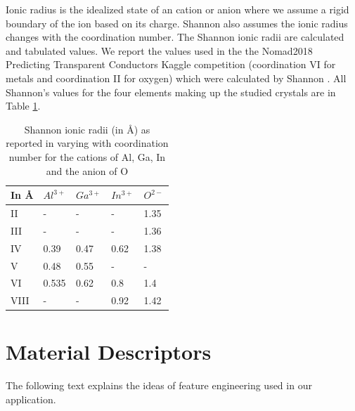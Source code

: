 \documentclass[11pt,oneside,czech,american]{book} %
\theoremstyle{plain}
\theoremstyle{definition}
\begin{document}
Ionic radius is the idealized state of an cation or anion where we assume a rigid boundary of the ion based on its charge. Shannon also assumes the ionic radius changes with the coordination number. The Shannon ionic radii are calculated and tabulated values. We report the values used in the the Nomad2018 Predicting Transparent Conductors Kaggle competition (coordination VI for metals and coordination II for oxygen) which were calculated by Shannon \parencite{shannon76}.  All Shannon's values for the four elements making up the studied crystals are in Table \ref{shannon_radii}.

\begin{table}[H]
	\centering
	\begin{tabular}{lllll} 
		\hline
		In \AA & $Al^{3+}$    & $Ga^{3+}$    & $In^{3+}$    & $O^{2-}$    \\ 
		\hline
		II     & - & - & - & 1.35  \\
		
		III     & - & - & - & 1.36  \\ 
		
		IV     & 0.39 & 0.47 & 0.62 & 1.38  \\ 
		
		V   & 0.48 & 0.55 & - & -  \\ 
		
		VI   & 0.535 & 0.62 & 0.8 & 1.4  \\ 
		
		VIII   & - & - & 0.92 & 1.42  \\
		\hline
	\end{tabular}
	
	\caption{Shannon ionic radii (in \AA) as reported in \parencite{shannon76} varying with coordination number for the cations of Al, Ga, In and the anion of O}
	\label{shannon_radii}
\end{table}



\section{Material Descriptors}
The following text explains the ideas of feature engineering used in our application.
\end{document}
